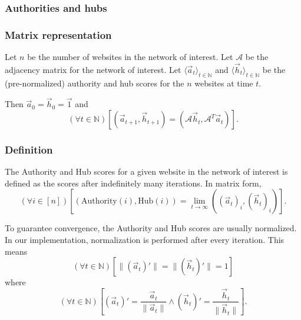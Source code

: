 \documentclass[12pt, titlepage, twoside]{amsart}
\newcommand{\N}{\ensuremath{\mathbb N}}
\begin{document}
\subsubsection{Authorities and hubs}

\subsubsection{Matrix representation}

Let $n$ be the number of websites in the network of interest.
Let $\mathcal{A}$ be the adjacency matrix for the network of interest.
Let $\langle\vec{a}_t\rangle_{t\in\N}$ and $\langle\vec{h}_t\rangle_{t\in\N}$ be the (pre-normalized) authority and hub
scores for the $n$ websites at time $t$.

Then $\vec{a}_0 = \vec{h}_0 = \vec{1}$ and
\[
  (\forall t\in\N)
  \left[
    \left(\vec{a}_{t + 1}, \vec{h}_{t + 1}\right) = \left(\mathcal{A}\vec{h}_t, \mathcal{A}^T\vec{a}_t\right)
  \right].
\]

\subsubsection{Definition} The Authority and Hub scores for a given website in the network of interest is defined
as the scores after indefinitely many iterations.
In matrix form,
\[
  (\forall i\in[n])
  \left[
    \left(\mathrm{Authority}(i), \mathrm{Hub}(i)\right) =
    \lim_{t\to\infty}
    \left((\vec{a}_t)_i, (\vec{h}_t)_i\right)
  \right].
\]

To guarantee convergence, the Authority and Hub scores are usually normalized.
In our implementation, normalization is performed after every iteration.
This means
\[
  (\forall t\in\N)
  \left[
    \lVert(\vec{a}_t)'\rVert = \lVert(\vec{h}_t)'\rVert = 1
  \right]
\]
where
\[
  (\forall t\in\N)
  \left[
    (\vec{a}_t)' = \frac{\vec{a}_t}{\lVert\vec{a}_t\rVert}
    \wedge
    (\vec{h}_t)' = \frac{\vec{h}_t}{\lVert\vec{h}_t\rVert}
  \right].
\]
\end{document}
